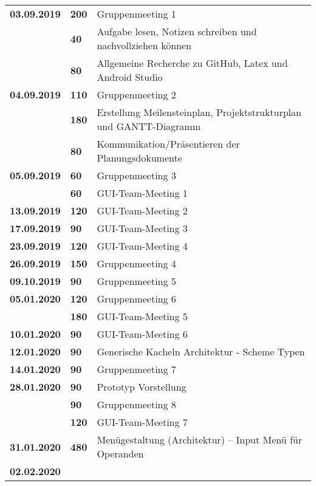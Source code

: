 {{\begin{longtable}{|l|l|p{11cm}|}
		\textbf{03.09.2019} 
		& \textbf{\hfill 200} & Gruppenmeeting 1 \\\cline{2-3}
		& \textbf{\hfill 40} & Aufgabe lesen, Notizen schreiben und nachvollziehen können \\\cline{2-3}
		& \textbf{\hfill 80} & Allgemeine Recherche zu GitHub, Latex und Android Studio
		\\	
		\hline \textbf{04.09.2019}
		& \textbf{\hfill 110} & Gruppenmeeting 2 \\\cline{2-3}
		& \textbf{\hfill 180} & Erstellung Meilensteinplan, Projektstrukturplan und GANTT-Diagramm \\\cline{2-3}
		& \textbf{\hfill 80} & Kommunikation/Präsentieren der Planungsdokumente
		\\ \hline \textbf{05.09.2019}
		& \textbf{\hfill 60} & Gruppenmeeting 3 \\\cline{2-3}
		& \textbf{\hfill 60} & GUI-Team-Meeting 1
		\\ \hline \textbf{13.09.2019}
		& \textbf{\hfill 120} & GUI-Team-Meeting 2
		\\	
		\hline \textbf{17.09.2019}
		& \textbf{\hfill 90} & GUI-Team-Meeting 3
		\\	
		\hline \textbf{23.09.2019}
		& \textbf{\hfill 120} & GUI-Team-Meeting 4
		\\	
		\hline \textbf{26.09.2019}
		& \textbf{\hfill 150} & Gruppenmeeting 4
		\\			
		\hline \textbf{09.10.2019}
		& \textbf{\hfill 90} & Gruppenmeeting 5
		\\	
		\hline \textbf{05.01.2020}
		& \textbf{\hfill 120} & Gruppenmeeting 6 \\\cline{2-3}
		& \textbf{\hfill 180} & GUI-Team-Meeting 5
		\\	
		\hline \textbf{10.01.2020}
		& \textbf{\hfill 90} & GUI-Team-Meeting 6
		\\	
		\hline \textbf{12.01.2020}
		& \textbf{\hfill 90} & Generische Kacheln Architektur - Scheme Typen
		\\	
		\hline \textbf{14.01.2020}
		& \textbf{\hfill 90} & Gruppenmeeting 7
		\\	
		\hline \textbf{28.01.2020}
		& \textbf{\hfill 90} & Prototyp Vorstellung \\\cline{2-3}
		& \textbf{\hfill 90} & Gruppenmeeting 8 \\
		& \textbf{\hfill 120} & GUI-Team-Meeting 7
		\\	
		\hline \textbf{31.01.2020}
		& \textbf{\hfill 480} & Menügestaltung (Architektur) – Input Menü für Operanden
		\\ \hline \textbf{02.02.2020}

\end{longtable}}}
